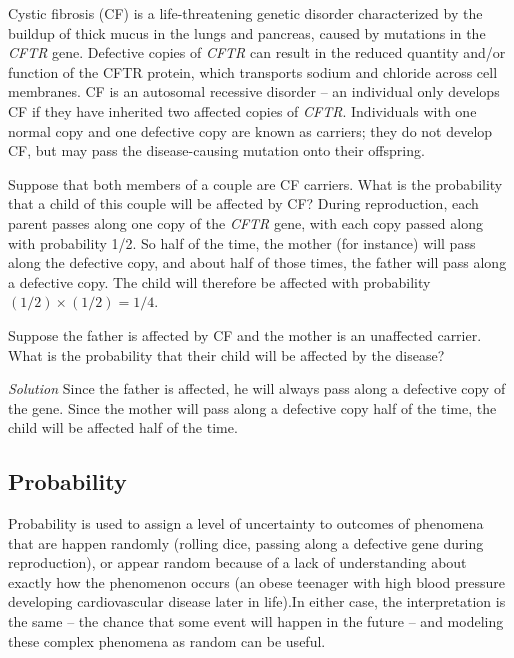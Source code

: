 \begin{example}
Cystic fibrosis (CF) is a life-threatening genetic disorder characterized by the buildup of thick mucus in the lungs and pancreas, caused by mutations in the \textit{CFTR} gene. Defective copies of \textit{CFTR} can result in the reduced quantity and/or function of the CFTR protein, which transports sodium and chloride across cell membranes. CF is an autosomal recessive disorder -- an individual only develops CF if they have inherited two affected copies of \textit{CFTR}. Individuals with one normal copy and one defective copy are known as carriers; they do not develop CF, but may pass the disease-causing mutation onto their offspring.

Suppose that both members of a couple are CF carriers. What is the probability that a child of this couple will be affected by CF?  During reproduction, each parent passes along one copy of the \textit{CFTR} gene, with each copy passed along with probability 1/2.  So half of the time, the mother (for instance) will pass along the defective copy, and about half of those times, the father will pass along a defective copy.  The child will therefore be affected with probability $(1/2) \times (1/2) = 1/4$.
	
\end{example}

\begin{exercise}
Suppose the father is affected by CF and the mother is an unaffected carrier.  What is the probability that their child will be affected by the disease?

\textit{Solution}  Since the father is affected, he will always pass along a defective copy of the gene.  Since the mother will pass along a defective copy half of the time, the child will be affected half of the time.

\end{exercise}

\subsection{Probability}


Probability is used to assign a level of uncertainty to outcomes of phenomena that are happen randomly (rolling dice, passing along a defective gene during reproduction), or appear random because of a lack of understanding about exactly  how the phenomenon occurs (an obese teenager with high blood pressure developing cardiovascular disease later in life).In either case, the interpretation is the same -- the chance that some event will happen in the future -- and modeling these complex phenomena as random can be useful.

